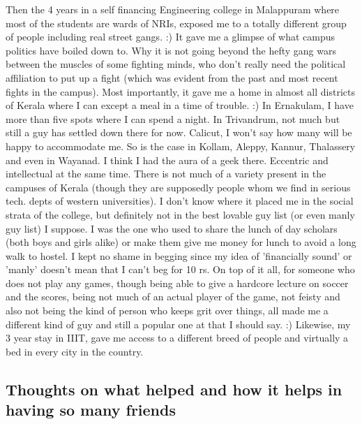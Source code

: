 {Then the 4 years in a self financing Engineering college in Malappuram where most of the students 
are wards of NRIs, exposed me to a totally different group of people including real street gangs. :) 
It gave me a glimpse of what campus politics have boiled down to. Why it is not going beyond the hefty 
gang wars between the muscles of some fighting minds, who don't really need the political affiliation 
to put up a fight (which was evident from the past and most recent fights in the campus). Most importantly, 
it gave me a home in almost all districts of Kerala where I can except a meal in a time of trouble. :) 
In Ernakulam, I have more than five spots where I can spend a night. In Trivandrum, not much but still 
a guy has settled down there for now. Calicut, I won't say how many will be happy to accommodate me. So is the case in Kollam, Aleppy, Kannur, Thalassery and even in Wayanad. I think I had the aura of a geek there.
Eccentric and intellectual at the same time. There is not much of a variety present in the campuses of Kerala
(though they are supposedly people whom we find in serious tech. depts of western universities). I
don't know where it placed me in the social strata of the college, but definitely not in the best lovable guy 
list (or even manly guy list) I suppose. I was the one who used to share the lunch of day
scholars (both boys and girls alike) or make them give me money for lunch to avoid a long walk to
hostel. I kept no shame in begging since my idea of 'financially sound' or 'manly' doesn't mean that I can't 
beg for 10 rs. On top of it all, for someone who does not play any games, though being able to give a hardcore lecture on soccer 
and the scores, being not much of an actual player of the game, not feisty and also not being the kind of person who keeps grit 
over things, all made me a different kind of guy and still a popular one at that I should say. :) Likewise, 
my 3 year stay in IIIT, gave me access to a different breed of people and virtually a bed in every 
city in the country.

\subsection*{Thoughts on what helped and how it helps in having so many friends}

}
